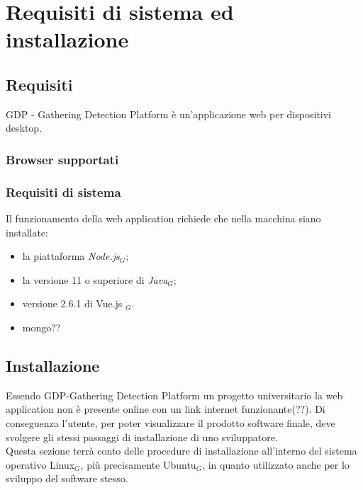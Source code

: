 \chapter{Requisiti di sistema ed installazione}\label{RequisitiDiSistemaEdInstallazione}

\section{Requisiti}\label{RequisitiDiSistemaEdInstallazioneRequisiti}
GDP - Gathering Detection Platform è un'applicazione web per dispositivi desktop.

\subsection{Browser supportati}\label{RequisitiDiSistemaEdInstallazioneRequisitiBrowserSupportati}

\subsection{Requisiti di sistema}\label{RequisitiDiSistemaEdInstallazioneRequisitiRequisitiDiSistema}

Il funzionamento della web application richiede che nella macchina siano installate:
\begin{itemize}
	\item la piattaforma \textit{Node.js}$_G$;
	\item la versione 11 o superiore di \textit{Java}$_G$;
	\item versione 2.6.1 di Vue.js $_G$.
	\item mongo??
\end{itemize}

\section{Installazione}\label{RequisitiDiSistemaEdInstallazioneInstallazione}

Essendo GDP-Gathering Detection Platform un progetto universitario la web application non è presente online con un link internet funzionante(??). Di conseguenza l'utente, per poter visualizzare il prodotto software finale, deve svolgere gli stessi passaggi di installazione di uno sviluppatore.\\
Questa sezione terrà conto delle procedure di installazione all'interno del sistema operativo Linux$_G$, più precisamente Ubuntu$_G$, in quanto utilizzato anche per lo sviluppo del software stesso.

